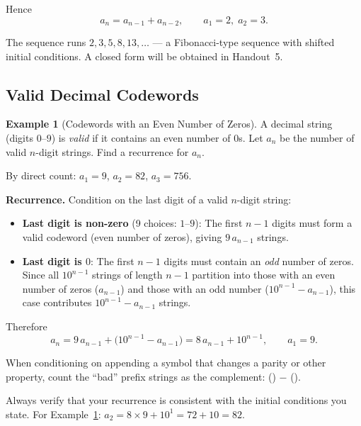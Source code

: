 \documentclass[11pt, a4paper, notitlepage]{report}
\theoremstyle{definition}
\newtheorem{example}[theorem]{Example}
\theoremstyle{remark}
\begin{document}
Hence
\[
  a_n = a_{n-1} + a_{n-2}, \qquad a_1 = 2,\; a_2 = 3.
\]

The sequence runs $2, 3, 5, 8, 13, \ldots$ — a Fibonacci-type sequence with shifted initial
conditions.  A closed form will be obtained in Handout~5.

\subsection{Valid Decimal Codewords}
\label{subsec:codewords}

\begin{example}[Codewords with an Even Number of Zeros]
\label{ex:codewords}
A decimal string (digits $0$--$9$) is \emph{valid} if it contains an even number of $0$s.
Let $a_n$ be the number of valid $n$-digit strings.  Find a recurrence for $a_n$.
\end{example}

By direct count: $a_1 = 9$, $a_2 = 82$, $a_3 = 756$.

\textbf{Recurrence.}  Condition on the last digit of a valid $n$-digit string:

\begin{itemize}
  \item \textbf{Last digit is non-zero} (9 choices: $1$--$9$): The first $n-1$ digits must form
        a valid codeword (even number of zeros), giving $9\,a_{n-1}$ strings.
  \item \textbf{Last digit is $0$}: The first $n-1$ digits must contain an \emph{odd} number of
        zeros.  Since all $10^{n-1}$ strings of length $n-1$ partition into those with an even
        number of zeros ($a_{n-1}$) and those with an odd number ($10^{n-1} - a_{n-1}$), this
        case contributes $10^{n-1} - a_{n-1}$ strings.
\end{itemize}

Therefore
\[
  a_n = 9\,a_{n-1} + \bigl(10^{n-1} - a_{n-1}\bigr) = 8\,a_{n-1} + 10^{n-1}, \qquad a_1 = 9.
\]

\begin{examtip}[title={Complementary Counting in Recurrences}]
When conditioning on appending a symbol that changes a parity or other property, count the
``bad'' prefix strings as the complement: () $-$ ().
\end{examtip}

\begin{warning}[title={Verifying Initial Conditions}]
Always verify that your recurrence is consistent with the initial conditions you state.
For Example~\ref{ex:codewords}: $a_2 = 8 \times 9 + 10^1 = 72 + 10 = 82$. \checkmark
\end{warning}
\end{document}
